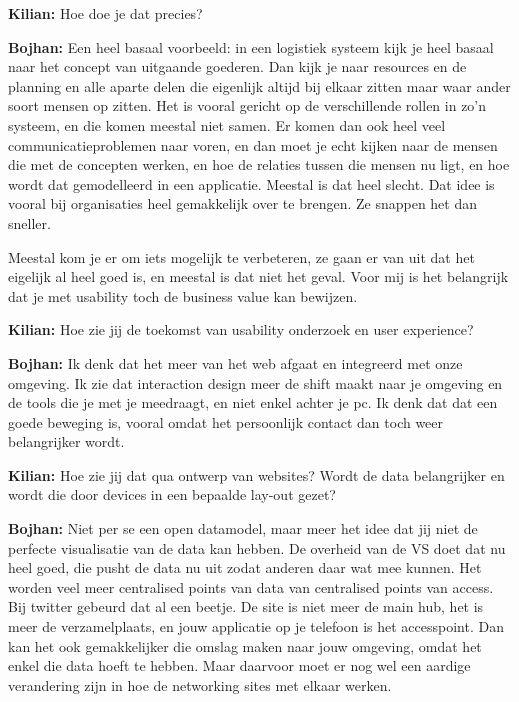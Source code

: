 \textbf{Kilian:} Hoe doe je dat precies?

\textbf{Bojhan:} Een heel basaal voorbeeld: in een logistiek systeem kijk je heel basaal naar het concept van uitgaande goederen. Dan kijk je naar resources en de planning en alle aparte delen die eigenlijk altijd bij elkaar zitten maar waar ander soort mensen op zitten. Het is vooral gericht op de verschillende rollen in zo'n systeem, en die komen meestal niet samen. Er komen dan ook heel veel communicatieproblemen naar voren, en dan moet je echt kijken naar de mensen die met de concepten werken, en hoe de relaties tussen die mensen nu ligt, en hoe wordt dat gemodelleerd in een applicatie. Meestal is dat heel slecht. Dat idee is vooral bij organisaties heel gemakkelijk over te brengen. Ze snappen het dan sneller.

Meestal kom je er om iets mogelijk te verbeteren, ze gaan er van uit dat het eigelijk al heel goed is, en meestal is dat niet het geval. Voor mij is het belangrijk dat je met usability toch de business value kan bewijzen.

\textbf{Kilian:} Hoe zie jij de toekomst van usability onderzoek en user experience?

\textbf{Bojhan:} Ik denk dat het meer van het web afgaat en integreerd met onze omgeving. Ik zie dat interaction design meer de shift maakt naar je omgeving en de tools die je met je meedraagt, en niet enkel achter je pc. Ik denk dat dat een goede beweging is, vooral omdat het persoonlijk contact dan toch weer belangrijker wordt.

\textbf{Kilian:} Hoe zie jij dat qua ontwerp van websites? Wordt de data belangrijker en wordt die door devices in een bepaalde lay-out gezet?

\textbf{Bojhan:} Niet per se een open datamodel, maar meer het idee dat jij niet de perfecte visualisatie van de data kan hebben. De overheid van de VS doet dat nu heel goed, die pusht de data nu uit zodat anderen daar wat mee kunnen. Het worden veel meer centralised points van data van centralised points van access. Bij twitter gebeurd dat al een beetje. De site is niet meer de main hub, het is meer de verzamelplaats, en jouw applicatie op je telefoon is het accesspoint. Dan kan het ook gemakkelijker die omslag maken naar jouw omgeving, omdat het enkel die data hoeft te hebben. Maar daarvoor moet er nog wel een aardige verandering zijn in hoe de networking sites met elkaar werken.

